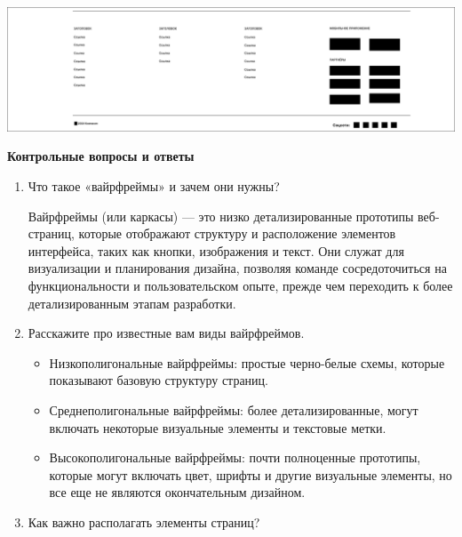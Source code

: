 \noindent
\begin{minipage}{\linewidth}
    \includegraphics[width=\linewidth]{Footer}
\end{minipage}
\bigskip

\textbf{Контрольные вопросы и ответы}

\begin{enumerate}
    \item Что такое «вайрфреймы» и зачем они нужны?

    Вайрфреймы (или каркасы) — это низко детализированные прототипы веб-страниц, которые отображают структуру и расположение элементов интерфейса, таких как кнопки, изображения и текст. Они служат для визуализации и планирования дизайна, позволяя команде сосредоточиться на функциональности и пользовательском опыте, прежде чем переходить к более детализированным этапам разработки.
    \item Расскажите про известные вам виды вайрфреймов.

        \begin{itemize}
            \item Низкополигональные вайрфреймы: простые черно-белые схемы, которые показывают базовую структуру страниц.
            \item Среднеполигональные вайрфреймы: более детализированные, могут включать некоторые визуальные элементы и текстовые метки.
            \item Высокополигональные вайрфреймы: почти полноценные прототипы, которые могут включать цвет, шрифты и другие визуальные элементы, но все еще не являются окончательным дизайном.
        \end{itemize}
    \item Как важно располагать элементы страниц?


\end{enumerate}
